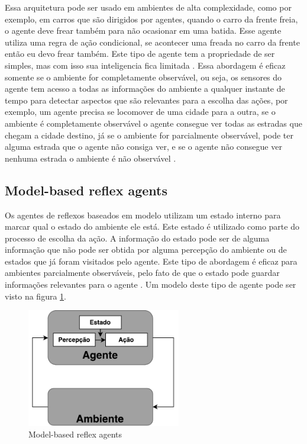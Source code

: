 Essa arquitetura pode ser usado em ambientes de alta complexidade, como por exemplo, em carros que são dirigidos por agentes, quando o carro da frente freia, o agente deve frear também para não ocasionar em uma batida. Esse agente utiliza uma regra de ação condicional, se acontecer uma freada no carro da frente então eu devo frear também. Este tipo de agente tem a propriedade de ser simples, mas com isso sua inteligencia fica limitada \cite{intelligence2003modern}. Essa abordagem é eficaz somente se o ambiente for completamente observável, ou seja, os sensores do agente tem acesso a todas as informações do ambiente a qualquer instante de tempo para detectar aspectos que são relevantes para a escolha das ações, por exemplo, um agente precisa se locomover de uma cidade para a outra, se o ambiente é completamente observável o agente consegue ver todas as estradas que chegam a cidade destino, já se o ambiente for parcialmente observável, pode ter alguma estrada que o agente não consiga ver, e se o agente não consegue ver nenhuma estrada o ambiente é não observável \cite{intelligence2003modern}. 

\subsection{Model-based reflex agents}

Os agentes de reflexos baseados em modelo utilizam um estado interno para marcar qual o estado do ambiente ele está. Este estado é utilizado como parte do processo de escolha da ação. A informação do estado pode ser de alguma informação que não pode ser obtida por alguma percepção do ambiente ou de estados que já foram visitados pelo agente. Este tipo de abordagem é eficaz para ambientes parcialmente observáveis, pelo fato de que o estado pode guardar informações relevantes para o agente \cite{intelligence2003modern}. Um modelo deste tipo de agente pode ser visto na figura \ref{fig:agenteModelbased}. 

\begin{figure}[ht]
	\centering
	\includegraphics[width=0.6\textwidth]{fig/agentModel.pdf}
	\caption{Model-based reflex agents}
	\label{fig:agenteModelbased}
\end{figure} 

